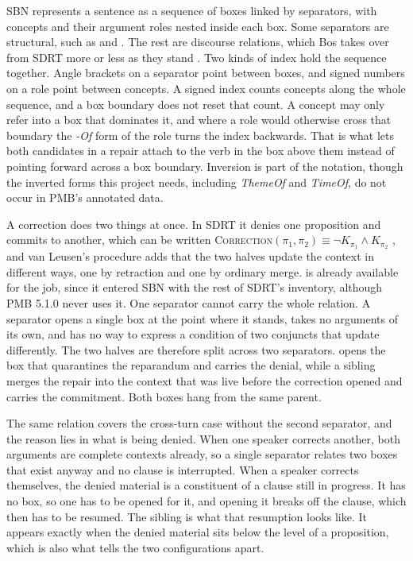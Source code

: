 \documentclass{article}
\begin{document}
SBN represents a sentence as a sequence of boxes linked by separators, with
concepts and their argument roles nested inside each box. Some separators are
structural, such as  and . The rest are
discourse relations, which Bos takes over from SDRT more or less as they stand
\citep{bosSBN}. Two kinds of index hold the sequence together. Angle brackets on a
separator point between boxes, and signed numbers on a role point between
concepts. A signed index counts concepts along the whole sequence, and a box
boundary does not reset that count. A concept may only refer into a box that
dominates it, and where a role would otherwise cross that boundary the
\emph{-Of} form of the role turns the index backwards. That is what lets both
candidates in a repair attach to the verb in the box above them instead of
pointing forward across a box boundary. Inversion is part of the notation, though
the inverted forms this project needs, including \emph{ThemeOf} and
\emph{TimeOf}, do not occur in PMB's annotated data.

A correction does two things at once. In SDRT it denies one proposition and
commits to another, which can be written
\textsc{Correction}$(\pi_1,\pi_2) \equiv \neg K_{\pi_1} \wedge K_{\pi_2}$
\citep{lascaridesSegmentedDiscourseRepresentation2007}, and van Leusen's procedure
adds that the two halves update the context in different ways, one by retraction
and one by ordinary merge.  is already available for the job,
since it entered SBN with the rest of SDRT's inventory, although PMB 5.1.0 never
uses it. One separator cannot carry the whole relation. A separator opens a single
box at the point where it stands, takes no arguments of its own, and has no way to
express a condition of two conjuncts that update differently. The two halves are
therefore split across two separators.  opens the box that
quarantines the reparandum and carries the denial, while a sibling
 merges the repair into the context that was live before the
correction opened and carries the commitment. Both boxes hang from the same
parent.

The same relation covers the cross-turn case without the second separator, and
the reason lies in what is being denied. When one speaker corrects another, both
arguments are complete contexts already, so a single separator relates two boxes
that exist anyway and no clause is interrupted. When a speaker corrects
themselves, the denied material is a constituent of a clause still in progress. It
has no box, so one has to be opened for it, and opening it breaks off the clause,
which then has to be resumed. The sibling  is what that
resumption looks like. It appears exactly when the denied material sits below the
level of a proposition, which is also what tells the two configurations apart.
\end{document}
